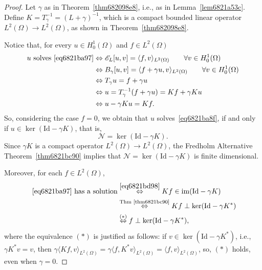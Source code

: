 \documentclass[a4paper,9pt]{amsart}
\newcommand{\scr}[1]{\mathscr{#1}}
\newcommand{\cal}[1]{\mathcal{#1}}
\newcommand{\Id}{\mathrm{Id}}	%
\newcommand{\IFF}{\Leftrightarrow}	%
\newcommand{\im}{\operatorname{im}}
\theoremstyle{plain}
\theoremstyle{definition}
\theoremstyle{remark}
\begin{document}
\begin{proof}
	Let $\gamma$ as in Theorem~\ref{thm682098e8}, i.e., as in Lemma~\ref{lem6821a53c}.
	Define $K = T_\gamma^{-1} = (L+\gamma)^{-1}$, which is a compact bounded linear operator $L^2(\Omega)\to L^2(\Omega)$, as shown in Theorem~\ref{thm682098e8}.
	
	Notice that, for every $u\in H^1_0(\Omega)$ and $f\in L^2(\Omega)$
	\begin{equation}\label{eq6821bd98}
	\begin{aligned}
		u\text{ solves~\eqref{eq6821ba97}}
		&\IFF \scr E_L[u,v] = \langle f,v \rangle_{L^2(\Omega)}\qquad\forall v\in H^1_0(\Omega) \\
		&\IFF B_\gamma[u,v] = \langle f+\gamma u ,v \rangle_{L^2(\Omega)}\qquad\forall v\in H^1_0(\Omega) \\
		&\IFF T_\gamma u = f+ \gamma u \\
		&\IFF u = T_\gamma^{-1}(f+\gamma u) = Kf + \gamma Ku \\
		&\IFF u-\gamma K u = Kf .
	\end{aligned}
	\end{equation}
	So, considering the case $f=0$, we obtain that $u$ solves~\eqref{eq6821ba8f}, if and only if 
	$u\in\ker(\Id-\gamma K)$,
	that is,
	\begin{equation}
		\cal N = \ker(\Id-\gamma K) .
	\end{equation}
	Since $\gamma K$ is a compact operator $L^2(\Omega)\to L^2(\Omega)$,
	the Fredholm Alternative Theorem~\ref{thm6821bc90} implies that $\cal N = \ker(\Id-\gamma K)$ is finite dimensional.
	
%	
	Moreover, for each $f\in L^2(\Omega)$,
	\begin{align}
		\text{~\eqref{eq6821ba97} has a solution}
		&\overset{\eqref{eq6821bd98}}\IFF Kf \in \im(\Id-\gamma K) \\
		&\overset{\text{Thm~\ref{thm6821bc90}}}\IFF Kf \perp \ker(\Id-\gamma K^*) \\
		&\overset{(*)}\IFF f \perp \ker(\Id-\gamma K^*) ,
	\end{align}
	where the equivalence $(*)$ is justified as follows:
	if $v\in \ker(\Id-\gamma K^*)$, i.e., $\gamma K^*v = v$, then 
	$\gamma\langle Kf,v \rangle_{L^2(\Omega)} 
	= \gamma\langle f,K^*v \rangle_{L^2(\Omega)}
	=  \langle f,v \rangle_{L^2(\Omega)}$,
	so, $(*)$ holds, even when $\gamma=0$.
	

\end{proof}
\end{document}
